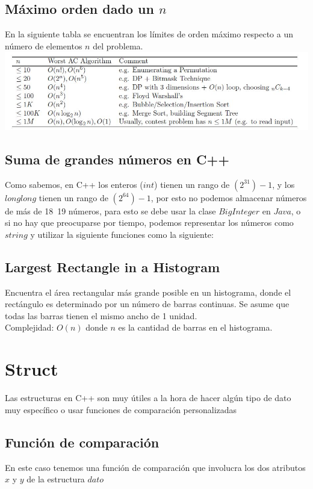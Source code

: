 \documentclass[10pt,letterpaper,twocolumn]{article}
\newcommand{\source}[1]{
  
  \dotfill
}
\begin{document}
  \subsection{Máximo orden dado un $n$}
    En la siguiente tabla se encuentran los límites de orden máximo respecto a un número de elementos $n$ del problema.\\
    \includegraphics[scale=0.5]{./src/maxorder.jpg}
  \subsection{Suma de grandes números en C++}
    Como sabemos, en C++ los enteros ($int$) tienen un rango de $(2^31)-1$, y los $long long$ tienen un rango de $(2^64)-1$, por esto no podemos almacenar números de más de 18~19 números, para esto se debe usar la clase $BigInteger$ en $Java$, o si no hay que preocuparse por tiempo, podemos representar los números como $string$ y utilizar la siguiente funciones como la siguiente:
    \source{./src/bigIntegerCpp.cpp}
  \subsection{Largest Rectangle in a Histogram}
    Encuentra el área rectangular más grande posible en un histograma, donde el rectángulo es determinado por un número de barras continuas. Se asume que todas las barras tienen el mismo ancho de 1 unidad. \\
    Complejidad: $O(n)$ donde $n$ es la cantidad de barras en el histograma.
    \source{./src/largest_rectangle.cpp}

\section{Struct}
  Las estructuras en C++ son muy útiles a la hora de hacer algún tipo de dato muy específico o usar funciones de comparación personalizadas
  \subsection{Función de comparación}
  En este caso tenemos una función de comparación que involucra los dos atributos $x$ y $y$ de la estructura $dato$
  \source{./src/struct.cpp}
\end{document}

